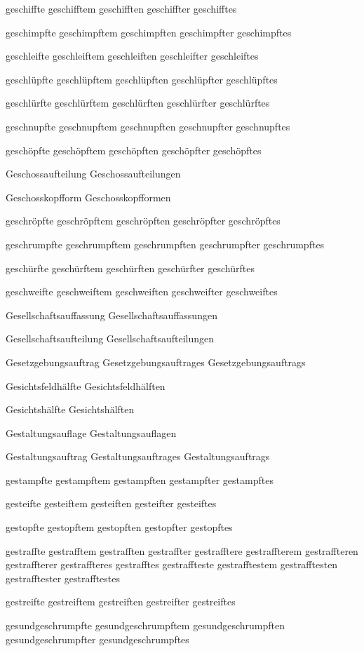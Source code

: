 geschiffte
geschifftem
geschifften
geschiffter
geschifftes

geschimpfte
geschimpftem
geschimpften
geschimpfter
geschimpftes

geschleifte
geschleiftem
geschleiften
geschleifter
geschleiftes

geschlüpfte
geschlüpftem
geschlüpften
geschlüpfter
geschlüpftes

geschlürfte
geschlürftem
geschlürften
geschlürfter
geschlürftes

geschnupfte
geschnupftem
geschnupften
geschnupfter
geschnupftes

geschöpfte
geschöpftem
geschöpften
geschöpfter
geschöpftes

Geschossaufteilung
Geschossaufteilungen

Geschosskopfform
Geschosskopfformen

geschröpfte
geschröpftem
geschröpften
geschröpfter
geschröpftes

geschrumpfte
geschrumpftem
geschrumpften
geschrumpfter
geschrumpftes

geschürfte
geschürftem
geschürften
geschürfter
geschürftes

geschweifte
geschweiftem
geschweiften
geschweifter
geschweiftes

Gesellschaftsauffassung
Gesellschaftsauffassungen

Gesellschaftsaufteilung
Gesellschaftsaufteilungen

Gesetzgebungsauftrag
Gesetzgebungsauftrages
Gesetzgebungsauftrags

Gesichtsfeldhälfte
Gesichtsfeldhälften

Gesichtshälfte
Gesichtshälften

Gestaltungsauflage
Gestaltungsauflagen

Gestaltungsauftrag
Gestaltungsauftrages
Gestaltungsauftrags

gestampfte
gestampftem
gestampften
gestampfter
gestampftes

gesteifte
gesteiftem
gesteiften
gesteifter
gesteiftes

gestopfte
gestopftem
gestopften
gestopfter
gestopftes

gestraffte
gestrafftem
gestrafften
gestraffter
gestrafftere
gestraffterem
gestraffteren
gestraffterer
gestraffteres
gestrafftes
gestraffteste
gestrafftestem
gestrafftesten
gestrafftester
gestrafftestes

gestreifte
gestreiftem
gestreiften
gestreifter
gestreiftes

gesundgeschrumpfte
gesundgeschrumpftem
gesundgeschrumpften
gesundgeschrumpfter
gesundgeschrumpftes

